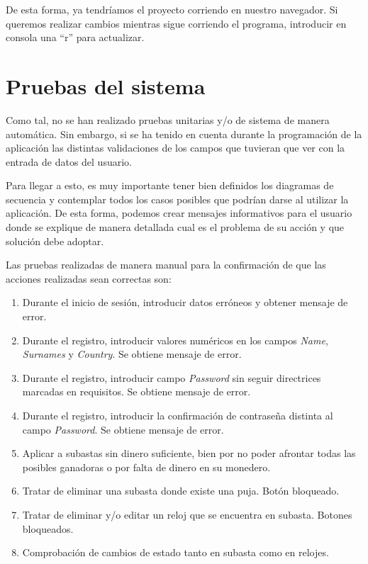 	De esta forma, ya tendríamos el proyecto corriendo en nuestro navegador. Si queremos realizar cambios mientras sigue corriendo el programa, introducir en consola una ``r'' para actualizar.

\section{Pruebas del sistema}

	Como tal, no se han realizado pruebas unitarias y/o de sistema de manera automática. Sin embargo, si se ha tenido en cuenta durante la programación de la aplicación las distintas validaciones de los campos que tuvieran que ver con la entrada de datos del usuario.
	
	Para llegar a esto, es muy importante tener bien definidos los diagramas de secuencia y contemplar todos los casos posibles que podrían darse al utilizar la aplicación. De esta forma, podemos crear mensajes informativos para el usuario donde se explique de manera detallada cual es el problema de su acción y que solución debe adoptar. 
	
	Las pruebas realizadas de manera manual para la confirmación de que las acciones realizadas sean correctas son:
	\begin{enumerate}
		\item Durante el inicio de sesión, introducir datos erróneos y obtener mensaje de error.
		\item Durante el registro, introducir valores numéricos en los campos \emph{Name}, \emph{Surnames} y \emph{Country}. Se obtiene mensaje de error.
		\item Durante el registro, introducir campo \emph{Password} sin seguir directrices marcadas en requisitos. Se obtiene mensaje de error.
		\item Durante el registro, introducir la confirmación de contraseña distinta al campo \emph{Password}. Se obtiene mensaje de error.
		\item Aplicar a subastas sin dinero suficiente, bien por no poder afrontar todas las posibles ganadoras o por falta de dinero en su monedero.
		\item Tratar de eliminar una subasta donde existe una puja. Botón bloqueado.
		\item Tratar de eliminar y/o editar un reloj que se encuentra en subasta. Botones bloqueados.
		\item Comprobación de cambios de estado tanto en subasta como en relojes.
	\end{enumerate}
